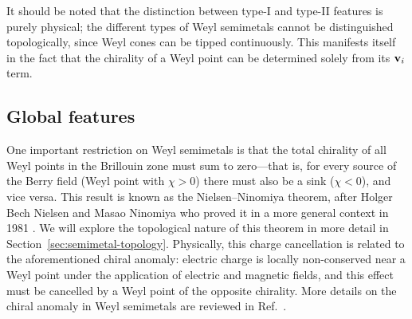 It should be noted that the distinction between type-I and type-II features is purely physical; the different types of Weyl semimetals cannot be distinguished topologically, since Weyl cones can be tipped continuously. This manifests itself in the fact that the chirality of a Weyl point can be determined solely from its $\vb{v}_i$ term.

\subsection{Global features}

One important restriction on Weyl semimetals is that the total chirality of all Weyl points in the Brillouin zone must sum to zero---that is, for every source of the Berry field (Weyl point with $\chi>0$) there must also be a sink ($\chi<0$), and vice versa. This result is known as the Nielsen--Ninomiya theorem, after Holger Bech Nielsen and Masao Ninomiya who proved it in a more general context in 1981 \cite{NielsenNinomiya_I,NielsenNinomiya_II}. We will explore the topological nature of this theorem in more detail in Section~\ref{sec:semimetal-topology}. Physically, this charge cancellation is related to the aforementioned chiral anomaly: electric charge is locally non-conserved near a Weyl point under the application of electric and magnetic fields, and this effect must be cancelled by a Weyl point of the opposite chirality. More details on the chiral anomaly in Weyl semimetals are reviewed in Ref.~\cite{Hosur_WSM-transport}.


